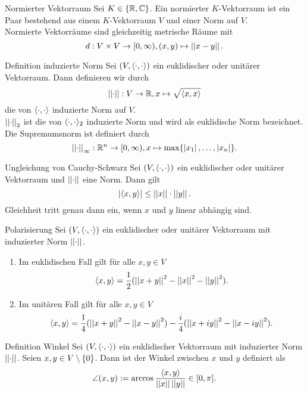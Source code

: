 \documentclass[main.tex]{subfiles}
\begin{document}
\begin{karte}{Normierter Vektorraum}
    Sei \(K \in \{\mathbb{R}, \mathbb{C}\}\). Ein normierter \(K\)-Vektorraum ist ein Paar bestehend
    aus einem \(K\)-Vektorraum \(V\) und einer Norm auf \(V\).\\
    Normierte Vektorräume sind gleichzeitig metrische Räume mit
    \[ d : V\times V \rightarrow [0, \infty), (x, y) \mapsto \left|\left|x-y\right|\right|. \]
\end{karte}

\begin{karte}{Definition induzierte Norm}
    Sei \((V, \langle \cdot, \cdot \rangle)\) ein euklidischer oder unitärer Vektorraum.
    Dann definieren wir durch
    \[ \left|\left|\cdot\right|\right| : V \rightarrow \mathbb{R}, x \mapsto \sqrt{\langle x, x \rangle} \]
    die von \(\langle \cdot, \cdot \rangle\) induzierte Norm auf \(V\).\\
    \(\left|\left|\cdot\right|\right|_2\) ist die von \(\langle \cdot, \cdot \rangle_2\) induzierte Norm und
    wird als euklidische Norm bezeichnet.\\
    Die Supremumsnorm ist definiert durch 
    \[ \left|\left|\cdot\right|\right|_\infty : \mathbb{R}^n \rightarrow [0,\infty), 
    x \mapsto \max\{\left| x_1 \right|, \ldots, \left| x_n \right|\}. \]
\end{karte}

\begin{karte}{Ungleichung von Cauchy-Schwarz}
    Sei \((V, \langle \cdot, \cdot \rangle)\) ein euklidischer oder unitärer Vektorraum
    und \(\left|\left|\cdot\right|\right|\) eine Norm. Dann gilt
    \[ \left| \langle x, y \rangle \right| \leq \left|\left|x\right|\right| \cdot \left|\left|y\right|\right|. \]
    Gleichheit tritt genau dann ein, wenn \(x\) und \(y\) linear abhängig sind.
\end{karte}

\begin{karte}{Polarisierung}
    Sei \((V, \langle \cdot, \cdot \rangle)\) ein euklidischer oder unitärer Vektorraum mit induzierter
    Norm \(\left|\left|\cdot\right|\right|\).
    \begin{enumerate}
        \item Im euklidischen Fall gilt für alle \(x, y \in V\)
        \[ \langle x, y \rangle = \frac{1}{2}(\left|\left|x+y\right|\right|^2-\left|\left|x\right|\right|^2-\left|\left|y\right|\right|^2). \]
        \item Im unitären Fall gilt für alle \(x, y \in V\)
        \[ \langle x, y \rangle = \frac{1}{4}(\left|\left|x+y\right|\right|^2-\left|\left|x-y\right|\right|^2) 
        - \frac{i}{4}(\left|\left|x+iy\right|\right|^2-\left|\left|x-iy\right|\right|^2). \]
    \end{enumerate}
\end{karte}

\begin{karte}{Definition Winkel}
    Sei \((V, \langle \cdot, \cdot \rangle)\) ein euklidischer Vektorraum mit induzierter Norm \(\left|\left|\cdot\right|\right|\).
    Seien \(x, y \in V \setminus \{0\}\). Dann ist der Winkel zwischen \(x\) und \(y\) definiert als
    \[ \angle (x,y) := \arccos \frac{\langle x, y \rangle}{\left|\left|x\right|\right| \left|\left|y\right|\right|} \in [0, \pi]. \]
\end{karte}
\end{document}
